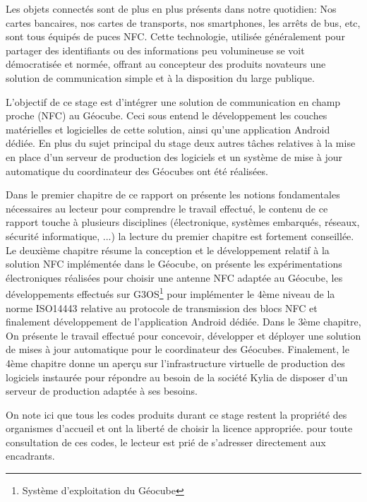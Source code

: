 \documentclass{themeensg}
\begin{document}
  \vspace{1.5cm}
  
	Les objets connectés sont de plus en plus présents dans notre quotidien: Nos cartes bancaires, nos cartes de transports, nos smartphones, les arrêts de bus, etc, sont tous équipés de puces NFC. Cette technologie, utilisée généralement pour partager des identifiants ou des informations peu volumineuse se voit démocratisée et normée, offrant au concepteur des produits novateurs une solution de communication simple et à la disposition du large publique.
	
	L'objectif de ce stage est d'intégrer une solution de communication en champ proche (NFC) au Géocube. Ceci sous entend le développement les couches matérielles et logicielles de cette solution, ainsi qu'une application Android dédiée. En plus du sujet principal du stage deux autres tâches relatives à la mise en place d'un serveur de production des logiciels et un système de mise à jour automatique du coordinateur des Géocubes ont été réalisées.
	
	Dans le premier chapitre de ce rapport on présente les notions fondamentales nécessaires au lecteur pour comprendre le travail effectué, le contenu de ce rapport touche à plusieurs disciplines (électronique, systèmes embarqués, réseaux, sécurité informatique, ...) la lecture du premier chapitre est fortement conseillée. Le deuxième chapitre résume la conception et le développement relatif à la solution NFC implémentée dans le Géocube, on présente les expérimentations électroniques réalisées pour choisir une antenne NFC adaptée au Géocube, les développements effectués sur G3OS\footnote{Système d'exploitation du Géocube} pour implémenter le 4ème niveau de la norme ISO14443 relative au protocole de transmission des blocs NFC et finalement développement de l'application Android dédiée. Dans le 3ème chapitre, On présente le travail effectué pour concevoir, développer et déployer une solution de mises à jour automatique pour le coordinateur des Géocubes. Finalement, le 4ème chapitre donne un aperçu sur l'infrastructure virtuelle de production des logiciels instaurée pour répondre au besoin de la société Kylia de disposer d'un serveur de production adaptée à ses besoins.
	
	 On note ici que tous les codes produits durant ce stage restent la propriété des organismes d'accueil et ont la liberté de choisir la licence appropriée. pour toute consultation de ces codes, le lecteur est prié de s'adresser directement aux encadrants.
\end{document}
